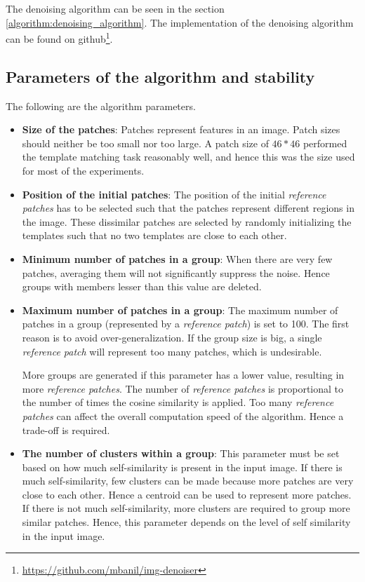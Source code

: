 \documentclass[fleqn,10pt]{wlscirep}
\begin{document}
The denoising algorithm can be seen in the section \ref{algorithm:denoising_algorithm}. The implementation of the denoising algorithm can be found on github\footnote{\url{https://github.com/mbanil/img-denoiser}}.

\subsection*{Parameters of the algorithm and stability}

The following are the algorithm parameters.

\begin{itemize}
	\item \textbf{Size of the patches}: Patches represent features in an image. Patch sizes should neither be too small nor too large. A patch size of $46*46$ performed the template matching task reasonably well, and hence this was the size used for most of the experiments. 
	
	\item \textbf{Position of the initial patches}: The position of the initial \textit{reference patches} has to be selected such that the patches represent different regions in the image. These dissimilar patches are selected by randomly initializing the templates such that no two templates are close to each other.
	
	\item \textbf{Minimum number of patches in a group}:  When there are very few patches, averaging them will not significantly suppress the noise. Hence groups with members lesser than this value are deleted.
	
	\item \textbf{Maximum number of patches in a group}: The maximum number of patches in a group (represented by a \textit{reference patch}) is set to 100. The first reason is to avoid over-generalization. If the group size is big, a single \textit{reference patch} will represent too many patches, which is undesirable. 
	
	More groups are generated if this parameter has a lower value, resulting in more \textit{reference patches}. The number of \textit{reference patches} is proportional to the number of times the cosine similarity is applied. Too many \textit{reference patches} can affect the overall computation speed of the algorithm. Hence a trade-off is required.
	
	\item \textbf{The number of clusters within a group}: This parameter must be set based on how much self-similarity is present in the input image. If there is much self-similarity, few clusters can be made because more patches are very close to each other. Hence a centroid can be used to represent more patches. If there is not much self-similarity, more clusters are required to group more similar patches. Hence, this parameter depends on the level of self similarity in the input image. 

\end{itemize}
\end{document}
